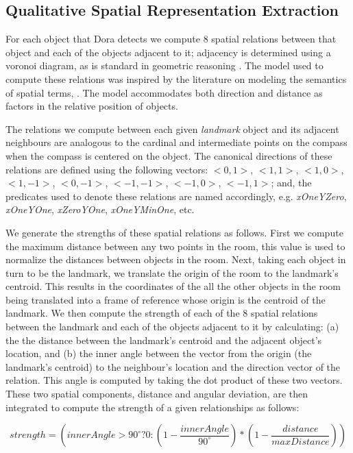 \subsection{Qualitative Spatial Representation Extraction}

For each object that Dora detects we compute 8 spatial relations between that object and each of the objects adjacent to it; adjacency is determined using a voronoi diagram, as is standard in geometric reasoning \cite{Forbus/etal2003}. The model used to compute these relations was inspired by the literature on modeling the semantics of spatial terms, \cite{kelleher/costello:09,kelleher/vanGenabith:2006,regier/carlson:2001,gapp:1994}. The model accommodates both direction and distance as factors in the relative position of objects. 

The relations we compute between each given \emph{landmark} object and its adjacent neighbours are analogous to the cardinal and intermediate points on the compass when the compass is centered on the object. The canonical directions of these relations are defined using the following vectors: $<0,1>$, $<1,1>$, $<1,0>$, $<1,-1>$, $<0,-1>$, $<-1,-1>$, $<-1,0>$, $<-1,1>$; and, the predicates used to denote these relations are named accordingly, e.g. \textit{xOneYZero}, \textit{xOneYOne}, \textit{xZeroYOne}, \textit{xOneYMinOne}, etc.

We generate the strengths of these spatial relations as follows. First we compute the maximum distance between any two points in the room, this value is used to normalize the distances between objects in the room. Next, taking each object in turn to be the landmark, we translate the origin of the room to the landmark's centroid. This results in the coordinates of the all the other objects in the room being translated into a frame of reference whose origin is the centroid of the landmark.  We then compute the strength of each of the 8 spatial relations between the landmark and each of the objects adjacent to it by calculating: (a) the the distance between the landmark's centroid and the adjacent object's location, and (b) the inner angle between the vector from the origin (the landmark's centroid) to the neighbour's location and the direction vector of the relation. This angle is computed by taking the dot product of these two vectors. These two spatial components, distance and angular deviation, are then integrated to compute the strength of a given relationships as follows: 

\begin{equation}
strength = (innerAngle > 90^{\circ}? 0 : (1- \frac{innerAngle}{90^{\circ}}) * (1- \frac{distance}{maxDistance}))
\end{equation}

